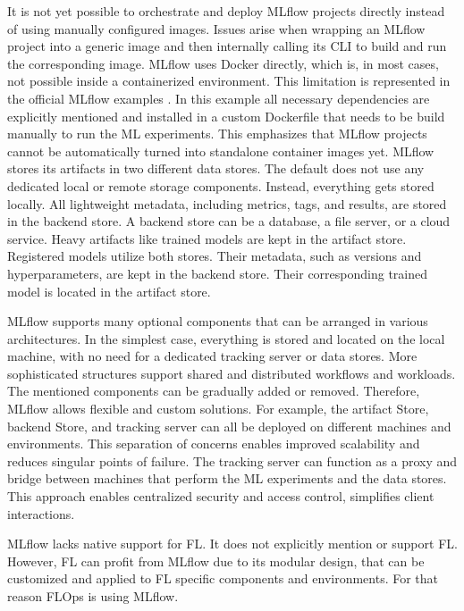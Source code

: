 It is not yet possible to orchestrate and deploy MLflow projects directly instead of using manually configured images.
Issues arise when wrapping an MLflow project into a generic image and then internally calling its CLI to build and run the corresponding image.
MLflow uses Docker directly, which is, in most cases, not possible inside a containerized environment.
This limitation is represented in the official MLflow examples \cite{mlflow:docker_example}.
In this example all necessary dependencies are explicitly mentioned and installed in a custom Dockerfile that needs to be build manually to run the ML experiments.
This emphasizes that MLflow projects cannot be automatically turned into standalone container images yet.
\vspace{5mm}
\newline
MLflow stores its artifacts in two different data stores.
The default does not use any dedicated local or remote storage components.
Instead, everything gets stored locally.
All lightweight metadata, including metrics, tags, and results, are stored in the backend store.
A backend store can be a database, a file server, or a cloud service.
Heavy artifacts like trained models are kept in the artifact store.
Registered models utilize both stores.
Their metadata, such as versions and hyperparameters, are kept in the backend store.
Their corresponding trained model is located in the artifact store.

MLflow supports many optional components that can be arranged in various architectures.
In the simplest case, everything is stored and located on the local machine, with no need for a dedicated tracking server or data stores.
More sophisticated structures support shared and distributed workflows and workloads.
The mentioned components can be gradually added or removed.
Therefore, MLflow allows flexible and custom solutions.
For example, the artifact Store, backend Store, and tracking server can all be deployed on different machines and environments.
This separation of concerns enables improved scalability and reduces singular points of failure.
The tracking server can function as a proxy and bridge between machines that perform the ML experiments and the data stores.
This approach enables centralized security and access control, simplifies client interactions.

MLflow lacks native support for FL.
It does not explicitly mention or support FL.
However, FL can profit from MLflow due to its modular design, that can be customized and applied to FL specific components and environments.
For that reason FLOps is using MLflow.